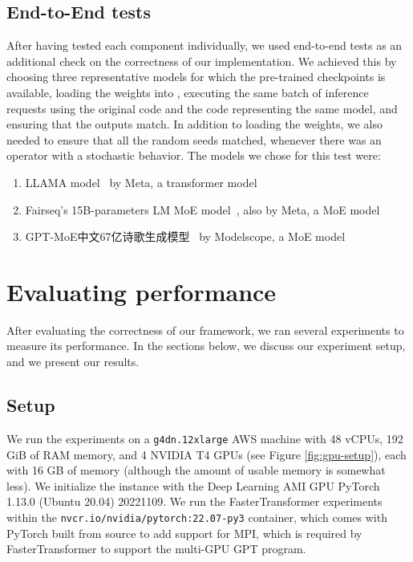 \subsection{End-to-End tests}
After having tested each component individually, we used end-to-end tests as an additional check on the correctness of our implementation. We achieved this by choosing three representative models for which the pre-trained checkpoints is available, loading the weights into \Project, executing the same batch of inference requests using the original code and the \Project code representing the same model, and ensuring that the outputs match. In addition to loading the weights, we also needed to ensure that all the random seeds matched, whenever there was an operator with a stochastic behavior. The models we chose for this test were:
\begin{enumerate}
    \item LLAMA model~\cite{touvron2023llama} by Meta, a transformer model
    \item Fairseq’s 15B-parameters LM MoE model~\cite{fairseq-moe-model}, also by Meta, a MoE model
    \item GPT-MoE中文67亿诗歌生成模型~\cite{modelscope-checkpoint} by Modelscope, a MoE model
\end{enumerate}

\section{Evaluating performance}
After evaluating the correctness of our framework, we ran several experiments to measure its performance. In the sections below, we discuss our experiment setup, and we present our results.

\subsection{Setup}
We run the experiments on a \texttt{g4dn.12xlarge} AWS machine with 48 vCPUs, 192 GiB of RAM memory, and 4 NVIDIA T4 GPUs (see Figure \ref{fig:gpu-setup}), each with 16 GB of memory (although the amount of usable memory is somewhat less). We initialize the instance with the Deep Learning AMI GPU PyTorch 1.13.0 (Ubuntu 20.04) 20221109. We run the FasterTransformer experiments within the \texttt{nvcr.io/nvidia/pytorch:22.07-py3} container, which comes with PyTorch built from source to add support for MPI, which is required by FasterTransformer to support the multi-GPU GPT program.

